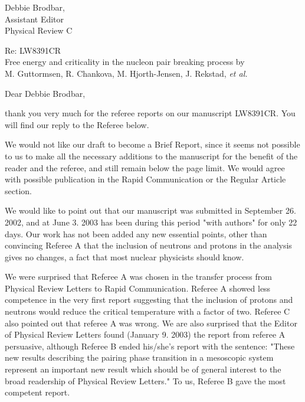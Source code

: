 \documentclass{letter}
\begin{document}
\address{Magne Guttormsen\\
Department of Physics\\ 
University of Oslo\\
P.O.Box 1048 Blindern\\ 
N-0316 Oslo, NORWAY}

\signature{Magne Guttormsen}

\begin{letter}{Debbie Brodbar,\\
Assistant Editor\\                               
Physical Review C}

\opening{Re: LW8391CR\\
Free energy and criticality in the nucleon pair breaking process by\\ 
M. Guttormsen, R. Chankova, M. Hjorth-Jensen, J. Rekstad, \sl et al\rm.}

Dear Debbie Brodbar,

thank you very much for the referee reports on our manuscript LW8391CR. You 
will find our reply to the Referee below.

We would not like our draft to become a Brief Report, since it seems not 
possible to us to make all the necessary additions to the manuscript for the
benefit of the reader and the referee, and still remain below the page limit.
We would agree with possible publication in the Rapid Communication or the
Regular Article section.

We would like to point out that our manuscript was submitted in September 26. 2002, and at June 3. 2003 has been during this period "with authors" for only 22 days. Our work has not been added any new essential points, other than convincing Referee A that the inclusion of neutrons and protons in the analysis gives no changes, a fact that most nuclear physicists should know.

We were surprised that Referee A was chosen in the transfer process from Physical Review Letters to Rapid Communication. Referee A showed less competence in the very first report suggesting that the inclusion of protons and neutrons would reduce the critical temperature with a factor of two. Referee C also pointed out that referee A was wrong. We are also surprised that the Editor of Physical Review Letters found (January 9. 2003) the report from referee A persuasive, although Referee B ended his/she's report with the sentence: "These new results describing the pairing phase transition in a mesoscopic system represent an important new result which should be of general interest to the broad readership of Physical Review Letters." To us, Referee B gave the most competent report.


\end{letter}
\end{document}
